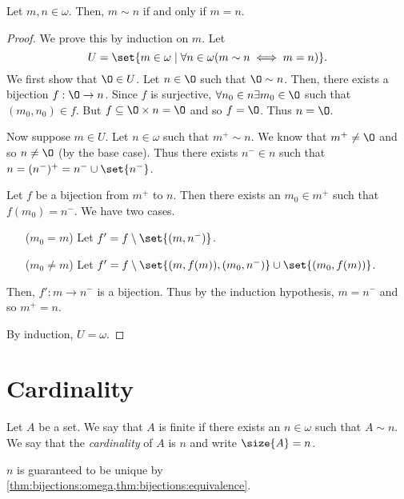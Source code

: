 \begin{theorem} \label{thm:bijections:omega}
    Let $m, n \in \omega$.
    Then, $m \sim n$ if and only if $m = n$.
\end{theorem}
\begin{proof}
    We prove this by induction on $m$.
    Let \[
        U = \set{m \in \omega \mid \forall n \in \omega (m \sim n \iff m = n)}.
    \]
    We first show that $\O \in U$.
    Let $n \in \O$ such that $\O \sim n$.
    Then, there exists a bijection $f : \O \to n$.
    Since $f$ is surjective, $\forall n_{0} \in n \exists m_{0} \in \O$ such that
    $(m_{0}, n_{0}) \in f$.
    But $f \subseteq \O \times n = \O$ and so $f = \O$.
    Thus $n = \O$.

    Now suppose $m \in U$.
    Let $n \in \omega$ such that $m^{+} \sim n$.
    We know that $m^{+} \neq \O$ and so $n \neq \O$ (by the base case).
    Thus there exists $n^{-} \in n$ such that $n = (n^{-})^{+}
    = n^{-} \cup \set{n^{-}}$.
    
    Let $f$ be a bijection from $m^{+}$ to $n$.
    Then there exists an $m_{0} \in m^{+}$ such that $f(m_{0}) = n^{-}$.
    We have two cases.
    \begin{itemize}
        \item[($m_{0} = m$)] Let $f' = f \setminus \set{(m, n^{-})}$.
        \item[($m_{0} \neq m$)] Let $f' = f \setminus
            \set{(m, f(m)), (m_{0}, n^{-})} \cup \set{(m_{0}, f(m))}$.
    \end{itemize}
    Then, $f' : m \to n^{-}$ is a bijection.
    Thus by the induction hypothesis, $m = n^{-}$ and so $m^{+} = n$.

    By induction, $U = \omega$.
\end{proof}

\section{Cardinality} \label{sec:cardinality}
\begin{definition} \label{def:cardinality:finite}
    Let $A$ be a set.
    We say that $A$ is finite if there exists an $n \in \omega$ such that
    $A \sim n$.
    We say that the \emph{cardinality} of $A$ is $n$ and write $\size{A} = n$.
\end{definition}
\begin{remark}
    $n$ is guaranteed to be unique by \cref{thm:bijections:omega,thm:bijections:equivalence}.
\end{remark}

